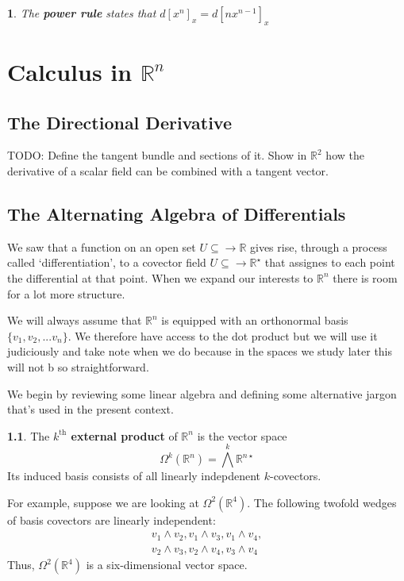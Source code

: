 \documentclass[oneside,english]{amsbook}
\numberwithin{section}{chapter}
\theoremstyle{plain}
\newtheorem{thm}{\protect\theoremname}
\theoremstyle{definition}
\newtheorem{defn}[thm]{\protect\definitionname}
\providecommand{\definitionname}{Definition}
\providecommand{\theoremname}{Theorem}
\begin{document}
			\begin{thm}
				The \textbf{power rule} states that $d[x^n]_x = d[nx^{n-1}]_x$
			\end{thm}

	\chapter{Calculus in $\mathbb{R}^n$}
	
		\section{The Directional Derivative}
		
		TODO: Define the tangent bundle and sections of it. Show in $\mathbb{R}^2$ how the derivative of a scalar field can be combined with a tangent vector. 
		
		\section{The Alternating Algebra of Differentials}
		
			We saw that a function on an open set $U\subseteq \to \mathbb{R}$ gives rise, through a process called `differentiation', to a covector field $U\subseteq \to \mathbb{R}^\star$ that assignes to each point the differential at that point. When we expand our interests to $\mathbb{R}^n$ there is room for a lot more structure.
			
			We will always assume that $\mathbb{R}^n$ is equipped with an orthonormal basis $\{v_1, v_2, ... v_n\}$. We therefore have access to the dot product but we will use it judiciously and take note when we do because in the spaces we study later this will not b so straightforward.
			
			We begin by reviewing some linear algebra and defining some alternative jargon that's used in the present context.
			
			\begin{defn}
				The \textbf{$k^{\text{th}}$ external product} of $\mathbb{R}^{n}$ is the vector space
					\[
						\Omega^k(\mathbb{R}^{n}) = \bigwedge^k \mathbb{R}^{n\star}
					\] 
				Its induced basis consists of all linearly indepdenent $k$-covectors.
			\end{defn}
			
			For example, suppose we are looking at $\Omega^2(\mathbb{R}^{4})$. The following twofold wedges of basis covectors are linearly independent:
				\begin{align}[c]
					v_1\wedge v_2, v_1\wedge v_3, v_1\wedge v_4, \\
					v_2\wedge v_3, v_2\wedge v_4, v_3\wedge v_4
				\end{align}
			Thus, $\Omega^2(\mathbb{R}^{4})$ is a six-dimensional vector space.
			
\end{document}
